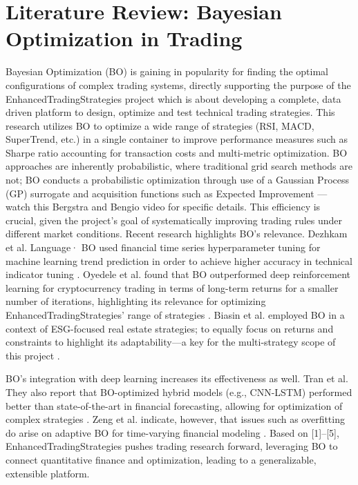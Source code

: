 \section{Literature Review: Bayesian Optimization in Trading}
Bayesian Optimization (BO) is gaining in popularity for finding the optimal configurations of complex trading systems, directly supporting the purpose of the EnhancedTradingStrategies project which is about developing a complete, data driven platform to design, optimize and test technical trading strategies. This research utilizes BO to optimize a wide range of strategies (RSI, MACD, SuperTrend, etc.) in a single container to improve performance measures such as Sharpe ratio accounting for transaction costs and multi-metric optimization. BO approaches are inherently probabilistic, where traditional grid search methods are not; BO conducts a probabilistic optimization through use of a Gaussian Process (GP) surrogate and acquisition functions such as Expected Improvement — watch this Bergstra and Bengio video for specific details. This efficiency is crucial, given the project’s goal of systematically improving trading rules under different market conditions. Recent research highlights BO’s relevance. Dezhkam et al. Language· BO used financial time series hyperparameter tuning for machine learning trend prediction in order to achieve higher accuracy in technical indicator tuning \cite{dezhkam_bayesian_2023}. Oyedele et al. found that BO outperformed deep reinforcement learning for cryptocurrency trading in terms of long-term returns for a smaller number of iterations, highlighting its relevance for optimizing EnhancedTradingStrategies’ range of strategies \cite{oyedele_bayesian_2023}. Biasin et al. employed BO in a context of ESG-focused real estate strategies; to equally focus on returns and constraints to highlight its adaptability—a key for the multi-strategy scope of this project \cite{biasin_esg_2024}.

BO’s integration with deep learning increases its effectiveness as well. Tran et al. They also report that BO-optimized hybrid models (e.g., CNN-LSTM) performed better than state-of-the-art in financial forecasting, allowing for optimization of complex strategies \cite{tran_cnn_lstm_2023}. Zeng et al. indicate, however, that issues such as overfitting do arise on adaptive BO for time-varying financial modeling \cite{zeng_adaptive_2025}. Based on [1]–[5], EnhancedTradingStrategies pushes trading research forward, leveraging BO to connect quantitative finance and optimization, leading to a generalizable, extensible platform.


